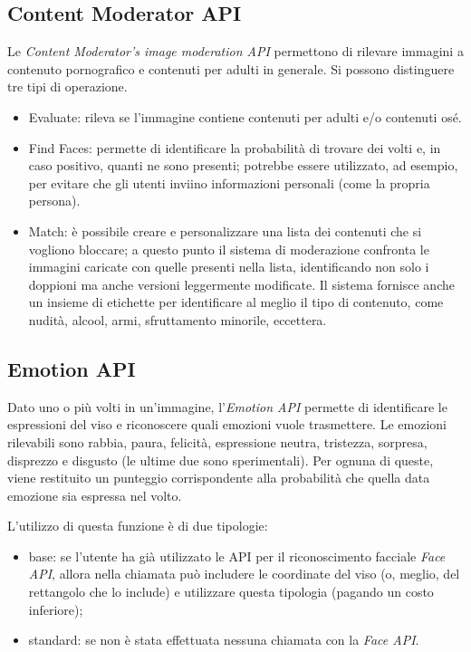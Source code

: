 \subsection{Content Moderator API}
Le \textit{Content Moderator’s image moderation API} \cite{microsoft-api-2} permettono di rilevare immagini a contenuto pornografico e contenuti per adulti in generale.
Si possono distinguere tre tipi di operazione.
\begin{itemize}
\item \textsf{Evaluate}: rileva se l'immagine contiene contenuti per adulti e/o contenuti osé.
\item \textsf{Find Faces}: permette di identificare la probabilità di trovare dei volti e, in caso positivo, quanti ne sono presenti; potrebbe essere utilizzato, ad esempio, per evitare che gli utenti inviino informazioni personali (come la propria persona).
\item \textsf{Match}: è possibile creare e personalizzare una lista dei contenuti che si vogliono bloccare; a questo punto il sistema di moderazione confronta le immagini caricate
con quelle presenti nella lista, identificando non solo i doppioni ma anche versioni leggermente modificate.
Il sistema fornisce anche un insieme di etichette per identificare al meglio il tipo di contenuto, come nudità, alcool, armi, sfruttamento minorile, eccettera.  
\end{itemize}
%
%
\subsection{Emotion API}
Dato uno o più volti in un'immagine, l'\textit{Emotion API} \cite{microsoft-api-4} permette di identificare le espressioni del viso e riconoscere quali emozioni vuole trasmettere.
Le emozioni rilevabili sono rabbia, paura, felicità, espressione neutra, tristezza, sorpresa, disprezzo e disgusto (le ultime due sono sperimentali).
Per ognuna di queste, viene restituito un punteggio corrispondente alla probabilità che quella data emozione sia espressa nel volto.

L'utilizzo di questa funzione è di due tipologie:
\begin{itemize}
\item base: se l'utente ha già utilizzato le API per il riconoscimento facciale \textit{Face API}, allora nella chiamata può includere le coordinate del viso
(o, meglio, del rettangolo che lo include) e utilizzare questa tipologia (pagando un costo inferiore);
\item standard: se non è stata effettuata nessuna chiamata con la \textit{Face API}.
\end{itemize}
%
